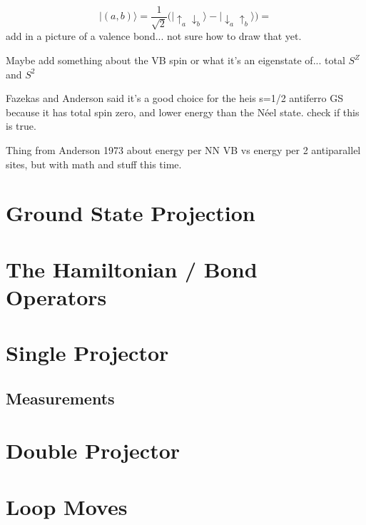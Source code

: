 \begin{equation}
   \lvert(a,b)\rangle = \frac{1}{\sqrt{2}}\big( \lvert \uparrow_a \downarrow_b \rangle - \lvert \downarrow_a \uparrow_b \rangle \big) = 
   \label{eqn_vb}
\end{equation}
{\color{red} add in a picture of a valence bond... not sure how to draw that yet.}  

{\color{red} Maybe add something about the VB spin or what it's an eigenstate of... total 
$S^Z$ and $S^2$}

{\color{red} Fazekas and Anderson said it's a good choice for the heis s=1/2 antiferro GS
because it has total spin zero, and lower energy than the N\'eel state.  check if this is true.}

{\color{red} Thing from Anderson 1973 about energy per NN VB vs energy per 2 antiparallel sites,
but with math and stuff this time.}


\section{Ground State Projection}
\section{The Hamiltonian / Bond Operators}
\section{Single Projector}
\subsection{Measurements}
\section{Double Projector}
\section{Loop Moves}
